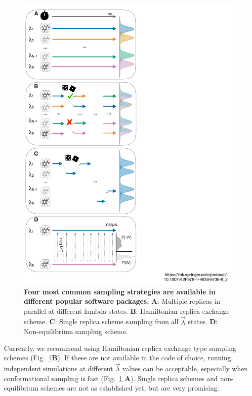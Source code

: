 \documentclass[9pt,bestpractices]{livecoms}
\begin{document}
%
\begin{figure}
    \includegraphics[width=0.95\columnwidth]{figures/fig8_sampl_scheme/Figure.pdf}
    \caption{\textbf{Four most common sampling strategies are available in different popular software packages.} \textbf{A}: Multiple replicas in parallel at different lambda states. \textbf{B}: Hamiltonian replica exchange scheme. \textbf{C}: Single replica scheme sampling from all $\vec{\lambda}$ states. \textbf{D}: Non-equilibrium sampling scheme.}
    \label{fig:fig_sampling_scheme}
\end{figure} 

Currently, we recommend using Hamiltonian replica exchange type sampling schemes (Fig.~\ref{fig:fig_sampling_scheme}\textbf{B}). If these are not available in the code of choice, running independent simulations at different $\vec{\lambda}$ values can be acceptable, especially when conformational sampling is fast (Fig.~\ref{fig:fig_sampling_scheme} \textbf{A}). Single replica schemes and non-equilibrium schemes are not as established yet, but are very promising.
\end{document}
